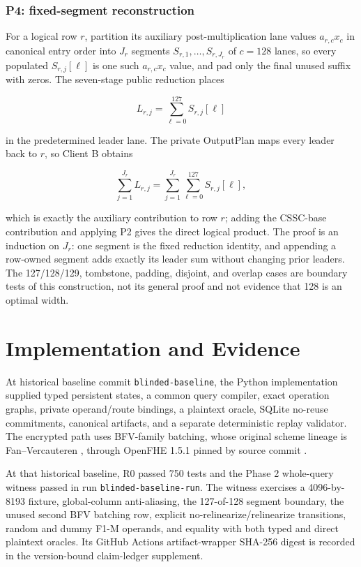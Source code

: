 \subsubsection{P4: fixed-segment reconstruction}\label{p4-fixed-segment-reconstruction}

For a logical row \(r\), partition its auxiliary post-multiplication lane values \(a_{r,c}x_c\) in canonical entry order into \(J_r\) segments \(S_{r,1},\ldots,S_{r,J_r}\) of \(c=128\) lanes, so every populated \(S_{r,j}[\ell]\) is one such \(a_{r,c}x_c\) value, and pad only the final unused suffix with zeros. The seven-stage public reduction places

\[
L_{r,j}=\sum_{\ell=0}^{127}S_{r,j}[\ell]
\]

in the predetermined leader lane. The private OutputPlan maps every leader back to \(r\), so Client B obtains

\[
\sum_{j=1}^{J_r}L_{r,j}
=\sum_{j=1}^{J_r}\sum_{\ell=0}^{127}S_{r,j}[\ell],
\]

which is exactly the auxiliary contribution to row \(r\); adding the CSSC-base contribution and applying P2 gives the direct logical product. The proof is an induction on \(J_r\): one segment is the fixed reduction identity, and appending a row-owned segment adds exactly its leader sum without changing prior leaders. The 127/128/129, tombstone, padding, disjoint, and overlap cases are boundary tests of this construction, not its general proof and not evidence that 128 is an optimal width.

\section{Implementation and Evidence}\label{implementation-and-evidence}

At historical baseline commit \texttt{blinded-baseline}, the Python implementation supplied typed persistent states, a common query compiler, exact operation graphs, private operand/route bindings, a plaintext oracle, SQLite no-reuse commitments, canonical artifacts, and a separate deterministic replay validator. The encrypted path uses BFV-family batching, whose original scheme lineage is Fan--Vercauteren \cite{fan2012somewhat}, through OpenFHE 1.5.1 pinned by source commit \cite{openfhe151}.

At that historical baseline, R0 passed 750 tests and the Phase 2 whole-query witness passed in run \texttt{blinded-baseline-run}. The witness exercises a 4096-by-8193 fixture, global-column anti-aliasing, the 127-of-128 segment boundary, the unused second BFV batching row, explicit no-relinearize/relinearize transitions, random and dummy F1-M operands, and equality with both typed and direct plaintext oracles. Its GitHub Actions artifact-wrapper SHA-256 digest is recorded in the version-bound claim-ledger supplement.

